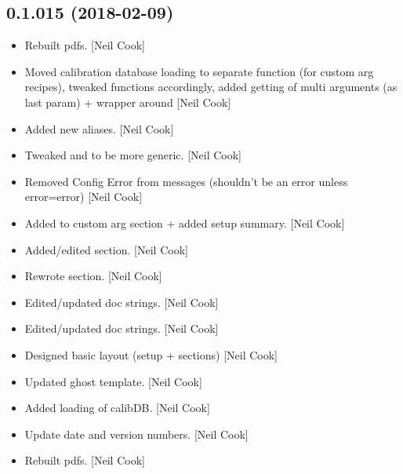 \documentclass[a4paper,10pt,english]{report}
\begin{document}
\subsection{0.1.015 (2018-02-09)}
\label{\detokenize{misc/changelog:id489}}\begin{itemize}
\item {} 
Rebuilt pdfs. {[}Neil Cook{]}

\item {} 
Moved calibration database loading to separate function (for custom
arg recipes), tweaked functions accordingly, added getting of multi
arguments (as last param) + wrapper around   {[}Neil
Cook{]}

\item {} 
Added new aliases. {[}Neil Cook{]}

\item {} 
Tweaked  and  to be more generic.
{[}Neil Cook{]}

\item {} 
Removed Config Error from messages (shouldn’t be an error unless
error=error) {[}Neil Cook{]}

\item {} 
Added to custom arg section + added setup summary. {[}Neil Cook{]}

\item {} 
Added/edited section. {[}Neil Cook{]}

\item {} 
Rewrote section. {[}Neil Cook{]}

\item {} 
Edited/updated doc strings. {[}Neil Cook{]}

\item {} 
Edited/updated doc strings. {[}Neil Cook{]}

\item {} 
Designed basic layout (setup + sections) {[}Neil Cook{]}

\item {} 
Updated ghost template. {[}Neil Cook{]}

\item {} 
Added loading of calibDB. {[}Neil Cook{]}

\item {} 
Update date and version numbers. {[}Neil Cook{]}

\item {} 
Rebuilt pdfs. {[}Neil Cook{]}


\end{itemize}
\end{document}
